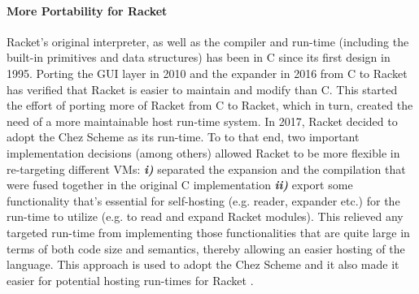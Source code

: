 \label{subsec:racketcs}

\vspace{-0.2cm}

\paragraph{More Portability for Racket} Racket's original interpreter, as well as the compiler and run-time
(including the built-in primitives and data structures) has been in C
since its first design in 1995. Porting the GUI layer in 2010 and the
expander in 2016 from C to Racket has verified that Racket is easier
to maintain and modify than C. This started the effort of porting more
of Racket from C to Racket, which in turn, created the need of a more
maintainable host run-time system. In 2017, Racket decided to adopt
the Chez Scheme as its run-time. To to that end, two important
implementation decisions (among others) allowed Racket to be more
flexible in re-targeting different VMs: \textit{\textbf{i)}} separated
the expansion and the compilation that were fused together in the
original C implementation \textit{\textbf{ii)}} export some
functionality that's essential for self-hosting (e.g. reader, expander
etc.) for the run-time to utilize (e.g. to read and expand Racket
modules). This relieved any targeted run-time from implementing those
functionalities that are quite large in terms of both code size and
semantics, thereby allowing an easier hosting of the language. This
approach is used to adopt the Chez Scheme and it also made it easier
for potential hosting run-times for Racket \cite{racket-on-chez-19}.
